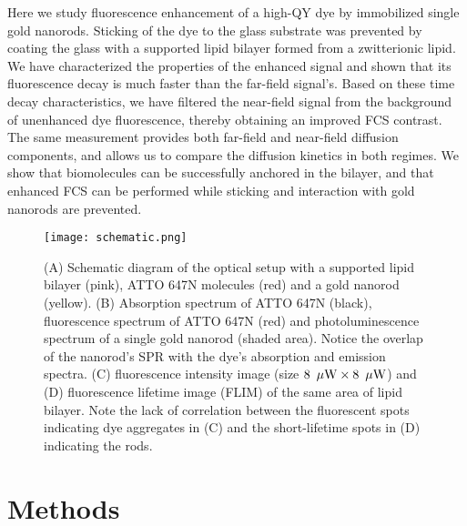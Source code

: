 Here we study fluorescence enhancement of a high-QY dye by immobilized single gold nanorods. Sticking of the dye to the glass substrate was prevented by coating the glass with a supported lipid bilayer formed from a zwitterionic lipid. We have characterized the properties of the enhanced signal and shown that its fluorescence decay is much faster than the far-field signal’s. Based on these time decay characteristics, we have filtered the near-field signal from the background of unenhanced dye fluorescence, thereby obtaining an improved FCS contrast. The same measurement provides both far-field and near-field diffusion components, and allows us to compare the diffusion kinetics in both regimes. We show that biomolecules can be successfully anchored in the bilayer, and that enhanced FCS can be performed while sticking and interaction with gold nanorods are prevented.\\
\begin{figure}
	\centering
	\texttt{[image: schematic.png]}
	\caption{(A) Schematic diagram of the optical setup with a supported lipid bilayer (pink), ATTO 647N molecules (red) and a gold nanorod (yellow). (B) Absorption spectrum of ATTO 647N (black), fluorescence spectrum of ATTO 647N (red) and photoluminescence spectrum of a single gold nanorod (shaded area). Notice the overlap of the nanorod's SPR with the dye's absorption and emission spectra. (C) fluorescence intensity image (size $8~\,\mu\textrm{W} \times 8~\,\mu\textrm{W}$) and (D) fluorescence lifetime image (FLIM) of the same area of lipid bilayer. Note the lack of correlation between the fluorescent spots indicating dye aggregates in (C) and the short-lifetime spots in (D) indicating the rods.}
	\label{fig:schematic}
\end{figure}
\section{Methods}
